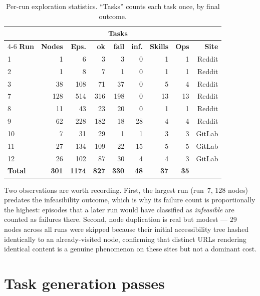 \begin{table}[H]
\centering
\caption[Per-run exploration statistics]{Per-run exploration statistics.
``Tasks'' counts each task once, by final outcome.}
\label{tab:app-runs}
\small
\begin{tabular}{@{}lrrrrrrrr@{}}
\toprule
& & & \multicolumn{3}{c}{\textbf{Tasks}} & & & \\
\cmidrule(lr){4-6}
\textbf{Run} & \textbf{Nodes} & \textbf{Eps.} & \textbf{ok} & \textbf{fail} &
\textbf{inf.} & \textbf{Skills} & \textbf{Ops} & \textbf{Site} \\
\midrule
1  &   1 &   6 &   3 &   3 &  0 &  1 &  1 & Reddit \\
2  &   1 &   8 &   7 &   1 &  0 &  1 &  1 & Reddit \\
3  &  38 & 108 &  71 &  37 &  0 &  5 &  4 & Reddit \\
7  & 128 & 514 & 316 & 198 &  0 & 13 & 13 & Reddit \\
8  &  11 &  43 &  23 &  20 &  0 &  1 &  1 & Reddit \\
9  &  62 & 228 & 182 &  18 & 28 &  4 &  4 & Reddit \\
10 &   7 &  31 &  29 &   1 &  1 &  3 &  3 & GitLab \\
11 &  27 & 134 & 109 &  22 & 15 &  5 &  5 & GitLab \\
12 &  26 & 102 &  87 &  30 &  4 &  4 &  3 & GitLab \\
\midrule
\textbf{Total} & \textbf{301} & \textbf{1174} & \textbf{827} & \textbf{330} &
\textbf{48} & \textbf{37} & \textbf{35} & \\
\bottomrule
\end{tabular}
\end{table}

\noindent
Two observations are worth recording. First, the largest run (run~7, 128 nodes)
predates the infeasibility outcome, which is why its failure count is
proportionally the highest: episodes that a later run would have classified as
\emph{infeasible} are counted as failures there. Second, node duplication is
real but modest --- 29 nodes across all runs were skipped because their initial
accessibility tree hashed identically to an already-visited node, confirming
that distinct URLs rendering identical content is a genuine phenomenon on these
sites but not a dominant cost.

\section{Task generation passes}
\label{app:runs-gen}

